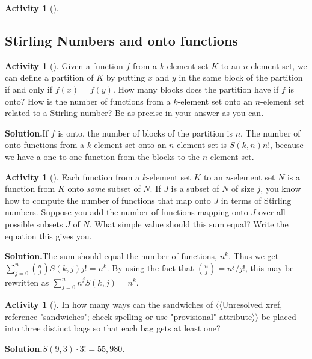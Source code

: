 \documentclass[10pt,]{book}
\theoremstyle{plain}
\theoremstyle{definition}
\newtheorem{activity}[project]{Activity}
\numberwithin{equation}{chapter}
\begin{document}
\begin{activity}[]
\begin{enumerate}[label=(\alph*)]
\end{enumerate}
\end{activity}
\typeout{************************************************}
\typeout{************************************************}
\subsection[{Stirling Numbers and onto functions}]{Stirling Numbers and onto functions}\label{subsection-34}
\begin{activity}[]\label{activity-125}
Given a function \(f\) from a \(k\)-element set \(K\) to an \(n\)-element set, we can define a partition of \(K\) by putting \(x\) and \(y\) in the same block of the partition if and only if \(f(x)=f(y)\). How many blocks does the partition have if \(f\) is onto? How is the number of functions from a \(k\)-element set onto an \(n\)-element set related to a Stirling number? Be as precise in your answer as you can.%
\par\medskip\noindent%
\textbf{Solution.}\quad If \(f\) is onto, the number of blocks of the partition is \(n\). The number of onto functions from a \(k\)-element set onto an \(n\)-element set is \(S(k,n)n!\), because we have a one-to-one function from the blocks to the \(n\)-element set.%
\end{activity}
\begin{activity}[]\label{Stirlingfalling}
Each function from a \(k\)-element set \(K\) to an \(n\)-element set \(N\) is a function from \(K\) onto \emph{some} subset of \(N\). If \(J\) is a subset of \(N\) of size \(j\), you know how to compute the number of functions that map onto \(J\) in terms of Stirling numbers. Suppose you add the number of functions mapping onto \(J\) over all possible subsets \(J\) of \(N\). What simple value should this sum equal? Write the equation this gives you.%
\par\medskip\noindent%
\textbf{Solution.}\quad The sum should equal the number of functions, \(n^k\). Thus we get \(\sum_{j=0}^n \binom{n}{j}S(k,j)j! = n^k\). By using the fact that \(\binom{n}{j}= n^{\underline{j}}/j!\), this may be rewritten as \(\sum_{j=0}^n n^{\underline{j}}S(k,j) = n^k.\)%
\end{activity}
\begin{activity}[]\label{activity-127}
In how many ways can the sandwiches of {$\langle\langle$Unresolved xref, reference "sandwiches"; check spelling or use "provisional" attribute$\rangle\rangle$} be placed into three distinct bags so that each bag gets at least one?%
\par\medskip\noindent%
\textbf{Solution.}\quad \(S(9,3)\cdot3!= 55,980\).%
\end{activity}
\end{document}

